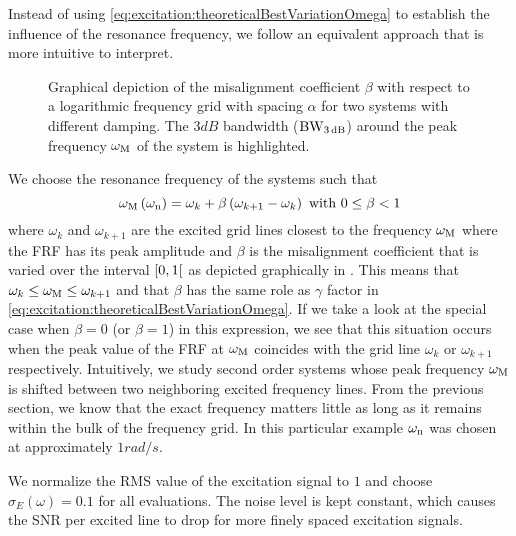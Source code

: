   Instead of using \eqref{eq:excitation:theoreticalBestVariationOmega} to establish the influence of the resonance frequency, we follow an equivalent approach that is more intuitive to interpret.

  \begin{figure}
    \centering
      \setlength{}
      \setlength\figureheight{0.5\figurewidth}
    
    \caption[Depiction of the grid misalignment $\beta$ for a logarithmic generalized multisine.]{Graphical depiction of the misalignment coefficient $\beta$ with respect to a logarithmic frequency grid with spacing $\alpha$ for two systems with different damping.
    The $3\unit{dB}$ bandwidth ($\mathrm{BW}_{3\,\mathrm{dB}}$) around the peak frequency $\omega_{\mathrm{M}}$ of the system is highlighted.}
    \label{fig:excitation:misalignment-logms}
  \end{figure}


  We choose the resonance frequency of the systems such that
  \begin{equation}
   \omega_{\mathrm{M}}\left( \omega_{\mathrm{n}} \right)  = \omega_k + \beta \left( \omega_{k+1} - \omega_k \right)
   \text{ with } 0 \leq \beta < 1
   \label{eq:excitation:chosenVariationOmega}
  \end{equation}
  where $\omega_k$ and $\omega_{k+1}$ are the excited grid lines closest to the frequency $\omega_{\mathrm{M}}$ where the FRF has its peak amplitude and $\beta$ is the misalignment coefficient that is varied over the interval $\left[ 0,1 \right[$ as depicted graphically in .
  This means that $\omega_k \leq \omega_{\mathrm{M}} \leq \omega_{k+1}$ and that $\beta$ has the same role as $\gamma$ factor in \eqref{eq:excitation:theoreticalBestVariationOmega}.
  If we take a look at the special case when $\beta=0$ (or $\beta=1$) in this expression, we see that this situation occurs when the peak value of the \gls{FRF} at $\omega_{\mathrm{M}}$ coincides with the grid line $\omega_k$ or $\omega_{k+1}$ respectively.
  Intuitively, we study second order systems whose peak frequency $\omega_{\mathrm{M}}$ is shifted between two neighboring excited frequency lines.
  From the previous section, we know that the exact frequency matters little as long as it remains within the bulk of the frequency grid.
  In this particular example $\omega_{\mathrm{n}}$ was chosen at approximately $1 \unit{rad/s}$.

  We normalize the \gls{RMS} value of the excitation signal to $1$ and choose $\sigma_E\left( \omega \right) = 0.1$ for all evaluations.
  The noise level is kept constant, which causes the \gls{SNR} per excited line to drop for more finely spaced excitation signals.
  
